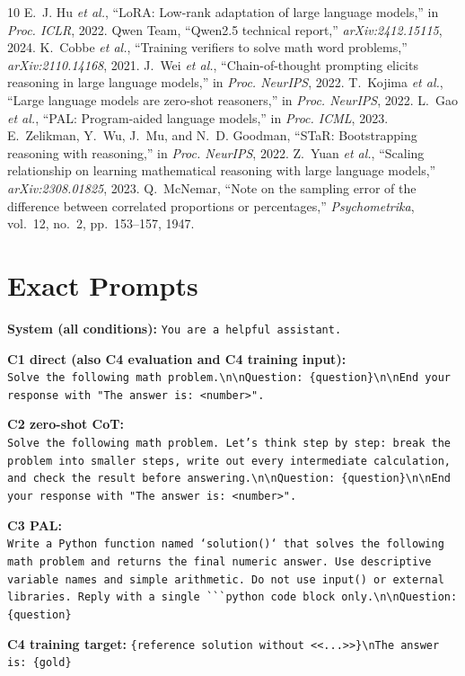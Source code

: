 \documentclass[conference]{IEEEtran}
\begin{document}
\begin{thebibliography}{10}
 E.~J. Hu \emph{et al.}, ``LoRA: Low-rank adaptation of large language models,'' in \emph{Proc. ICLR}, 2022.
 Qwen Team, ``Qwen2.5 technical report,'' \emph{arXiv:2412.15115}, 2024.
 K.~Cobbe \emph{et al.}, ``Training verifiers to solve math word problems,'' \emph{arXiv:2110.14168}, 2021.
 J.~Wei \emph{et al.}, ``Chain-of-thought prompting elicits reasoning in large language models,'' in \emph{Proc. NeurIPS}, 2022.
 T.~Kojima \emph{et al.}, ``Large language models are zero-shot reasoners,'' in \emph{Proc. NeurIPS}, 2022.
 L.~Gao \emph{et al.}, ``PAL: Program-aided language models,'' in \emph{Proc. ICML}, 2023.
 E.~Zelikman, Y.~Wu, J.~Mu, and N.~D. Goodman, ``STaR: Bootstrapping reasoning with reasoning,'' in \emph{Proc. NeurIPS}, 2022.
 Z.~Yuan \emph{et al.}, ``Scaling relationship on learning mathematical reasoning with large language models,'' \emph{arXiv:2308.01825}, 2023.
 Q.~McNemar, ``Note on the sampling error of the difference between correlated proportions or percentages,'' \emph{Psychometrika}, vol.~12, no.~2, pp.~153--157, 1947.
\end{thebibliography}

\appendices
\section{Exact Prompts}\label{app:prompts}
\footnotesize
\textbf{System (all conditions):} \texttt{You are a helpful assistant.}

\textbf{C1 direct (also C4 evaluation and C4 training input):}\\
\texttt{Solve the following math problem.\textbackslash n\textbackslash nQuestion: \{question\}\textbackslash n\textbackslash nEnd your response with "The answer is: <number>".}

\textbf{C2 zero-shot CoT:}\\
\texttt{Solve the following math problem. Let's think step by step: break the problem into smaller steps,
write out every intermediate calculation, and check the result before answering.\textbackslash n\textbackslash nQuestion:
\{question\}\textbackslash n\textbackslash nEnd your response with "The answer is: <number>".}

\textbf{C3 PAL:}\\
\texttt{Write a Python function named `solution()` that solves the following math problem and returns the
final numeric answer. Use descriptive variable names and simple arithmetic. Do not use input() or external
libraries. Reply with a single \`{}\`{}\`{}python code block only.\textbackslash n\textbackslash nQuestion: \{question\}}

\textbf{C4 training target:} \texttt{\{reference solution without <<...>>\}\textbackslash nThe answer is: \{gold\}}
\end{document}
